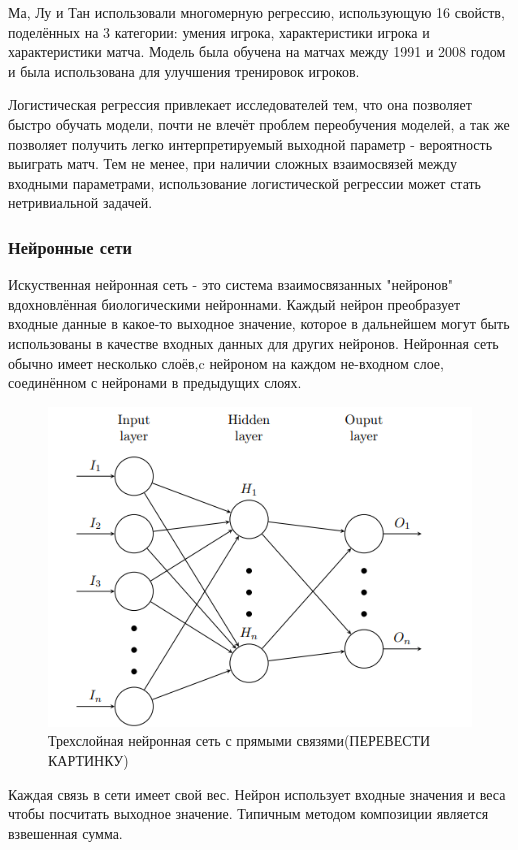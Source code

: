 Ма, Лу и Тан\cite{Book11} использовали многомерную регрессию, использующую 16 свойств, поделённых на 3 категории: умения игрока, характеристики игрока и характеристики матча. Модель была обучена на матчах между 1991 и 2008 годом и была использована для улучшения тренировок игроков.

Логистическая регрессия привлекает исследователей тем, что она позволяет быстро обучать модели, почти не влечёт проблем переобучения моделей, а так же позволяет получить легко интерпретируемый выходной параметр - вероятность выиграть матч. Тем не менее, при наличии сложных взаимосвязей между входными параметрами, использование логистической регрессии может стать нетривиальной задачей.

\subsubsection{Нейронные сети}
Искуственная нейронная сеть - это система взаимосвязанных "нейронов"\, вдохновлённая биологическими нейроннами. Каждый нейрон преобразует входные данные в какое-то выходное значение, которое в дальнейшем могут быть использованы в качестве входных данных для других нейронов. Нейронная сеть обычно имеет несколько слоёв,c нейроном на каждом не-входном слое, соединённом с нейронами в предыдущих слоях.
\begin{figure}[!h]
	\centering
	\includegraphics[width=.9\textwidth]{img/img1.png}
	\caption{Трехслойная нейронная сеть с прямыми связями(ПЕРЕВЕСТИ КАРТИНКУ)}
	\label{fig01}
\end{figure}
Каждая связь в сети имеет свой вес. Нейрон использует входные значения и веса чтобы посчитать выходное значение. Типичным методом композиции является  взвешенная сумма.

